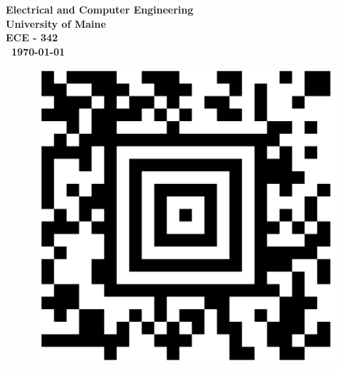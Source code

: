 \documentclass{article}
\begin{document}
\begin{titlepage}
\begin{center}
\begin{abstract}
        
        
        \end{abstract}
        
        
        \vspace{02.5cm}
        \textbf{
        Electrical and Computer Engineering\\
        University of Maine\\
        ECE - 342\\\ \today}
    \vspace{.5cm}
        \begin{figure}[H]
        \centering
        \includegraphics[scale = 0.1]{Images/barcode.png}
\end{figure}
    \end{center}
\end{titlepage}
\end{document}

